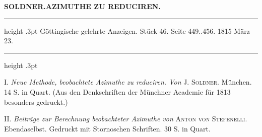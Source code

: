 \clearpage
\begingroup
\pagestyle{empty}
\newcommand{\GaussVIGathering}[1]{%
  \fancypagestyle{gaussVIGathering}{%
    \fancyhf{}%
    \renewcommand{\headrulewidth}{0pt}%
    \renewcommand{\footrulewidth}{0pt}%
    \fancyfoot[C]{\makebox[\textwidth][l]{%
      \hspace*{.025\textwidth}{\footnotesize\bfseries VI.}\hfill
      {\normalsize\bfseries\textls[90]{#1}}\hspace*{.18\textwidth}}}%
  }%
  \thispagestyle{gaussVIGathering}%
}
\thispagestyle{empty}
\noindent{}%
\makebox[12mm][l]{}%
\parbox[t]{\dimexpr\linewidth-24mm\relax}{\centering\footnotesize\bfseries SOLDNER.\enspace AZIMUTHE ZU REDUCIREN.\par}%
\par\medskip
\begin{center}
\parbox{.82\linewidth}{%
\centering\small
\hrule height .3pt\relax\vspace{2.5pt}
Göttingische gelehrte Anzeigen. Stück 46. Seite 449..456. 1815 März 23.\par
\vspace{2.5pt}\hrule height .3pt\relax
}
\end{center}

I. \emph{Neue Methode, beobachtete Azimuthe zu reduciren. Von} J. \textsc{Soldner}. München. 14 S. in Quart. (Aus den Denkschriften der Münchner Academie für 1813 besonders gedruckt.)

II. \emph{Beiträge zur Berechnung beobachteter Azimuthe von} \textsc{Anton von Stefenelli}. Ebendaselbst. Gedruckt mit Stornoschen Schriften. 30 S. in Quart.

